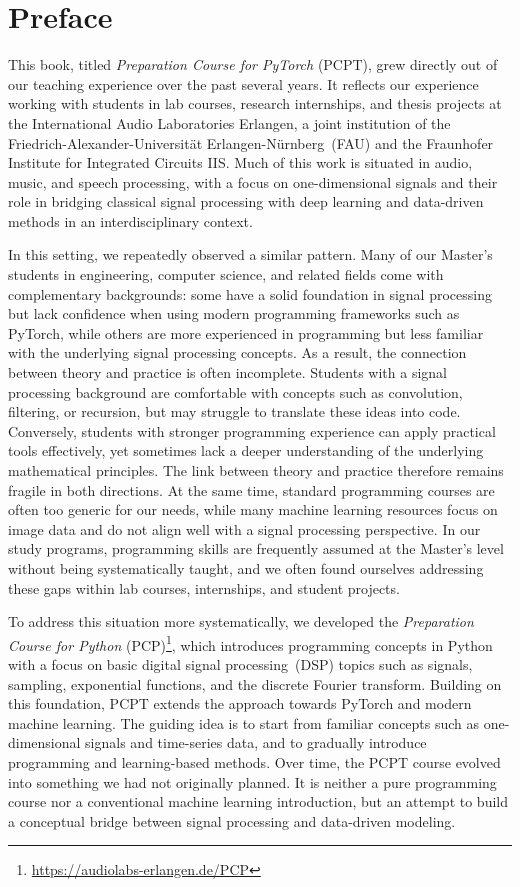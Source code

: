 \section*{Preface}

{\fontsize{8.5}{12}\selectfont
This book, titled \emph{Preparation Course for PyTorch} (PCPT), grew directly out of our teaching experience over the past several years. It reflects our experience working with students in lab courses, research internships, and thesis projects at the International Audio Laboratories Erlangen, a joint institution of the Friedrich-Alexander-Universität Erlangen-Nürnberg~(FAU) and the Fraunhofer Institute for Integrated Circuits IIS. Much of this work is situated in audio, music, and speech processing, with a focus on one-dimensional signals and their role in bridging classical signal processing with deep learning and data-driven methods in an interdisciplinary context.

In this setting, we repeatedly observed a similar pattern. Many of our Master's students in engineering, computer science, and related fields come with complementary backgrounds: some have a solid foundation in signal processing but lack confidence when using modern programming frameworks such as PyTorch, while others are more experienced in programming but less familiar with the underlying signal processing concepts. As a result, the connection between theory and practice is often incomplete. Students with a signal processing background are comfortable with concepts such as convolution, filtering, or recursion, but may struggle to translate these ideas into code. Conversely, students with stronger programming experience can apply practical tools effectively, yet sometimes lack a deeper understanding of the underlying mathematical principles. The link between theory and practice therefore remains fragile in both directions. At the same time, standard programming courses are often too generic for our needs, while many machine learning resources focus on image data and do not align well with a signal processing perspective. In our study programs, programming skills are frequently assumed at the Master's level without being systematically taught, and we often found ourselves addressing these gaps within lab courses, internships, and student projects.

To address this situation more systematically, we developed the \emph{Preparation Course for Python} (PCP)\footnote{\url{https://audiolabs-erlangen.de/PCP}}, which introduces programming concepts in Python with a focus on basic digital signal processing~(DSP) topics such as signals, sampling, exponential functions, and the discrete Fourier transform. Building on this foundation, PCPT extends the approach towards PyTorch and modern machine learning. The guiding idea is to start from familiar concepts such as one-dimensional signals and time-series data, and to gradually introduce programming and learning-based methods. Over time, the PCPT course evolved into something we had not originally planned. It is neither a pure programming course nor a conventional machine learning introduction, but an attempt to build a conceptual bridge between signal processing and data-driven modeling.

}
